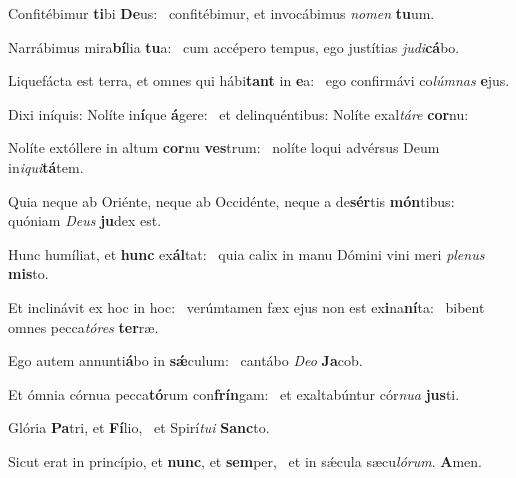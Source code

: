 \item Confitébimur \textbf{ti}bi \textbf{De}us:~\psstar{} confitébimur, et invocábimus \textit{nomen} \textbf{tu}um.
\item Narrábimus mira\textbf{bí}lia \textbf{tu}a:~\psstar{} cum accépero tempus, ego justítias \textit{judi}\textbf{cá}bo.
\item Liquefácta est terra, et omnes qui hábi\textbf{tant} in \textbf{e}a:~\psstar{} ego confirmávi co\textit{lúmnas} \textbf{e}jus.
\item Dixi iníquis: Nolíte in\textbf{í}que \textbf{á}gere:~\psstar{} et delinquéntibus: Nolíte exal\textit{táre} \textbf{cor}nu:
\item Nolíte extóllere in altum \textbf{cor}nu \textbf{ves}trum:~\psstar{} nolíte loqui advérsus Deum in\textit{iqui}\textbf{tá}tem.
\item Quia neque ab Oriénte, neque ab Occidénte, neque a de\textbf{sér}tis \textbf{món}tibus:~\psstar{} quóniam \textit{Deus} \textbf{ju}dex est.
\item Hunc humíliat, et \textbf{hunc} ex\textbf{ál}tat:~\psstar{} quia calix in manu Dómini vini meri \textit{plenus} \textbf{mis}to.
\item Et inclinávit ex hoc in hoc:~\pscross{} verúmtamen fæx ejus non est ex\textbf{i}na\textbf{ní}ta:~\psstar{} bibent omnes pecca\textit{tóres} \textbf{ter}ræ.
\item Ego autem annunti\textbf{á}bo in \textbf{sǽ}culum:~\psstar{} cantábo \textit{Deo} \textbf{Ja}cob.
\item Et ómnia córnua pecca\textbf{tó}rum con\textbf{frín}gam:~\psstar{} et exaltabúntur cór\textit{nua} \textbf{jus}ti.
\item Glória \textbf{Pa}tri, et \textbf{Fí}lio,~\psstar{} et Spirí\textit{tui} \textbf{Sanc}to.
\item Sicut erat in princípio, et \textbf{nunc}, et \textbf{sem}per,~\psstar{} et in sǽcula sæcu\textit{lórum}. \textbf{A}men.
